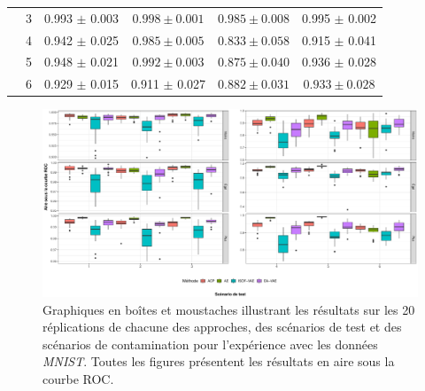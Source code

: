 \begin{table}[h]
\begin{tabular}{|c|c|c c c c|}
		& 3 & 0.993 $\pm$ 0.003 & $\mathbf{0.998 \pm 0.001}$ & $0.985 \pm 0.008$ & 0.995 $\pm$ 0.002   \\
		& 4 & 0.942 $\pm$ 0.025 & $\mathbf{0.985 \pm 0.005}$ & $0.833 \pm 0.058$ & 0.915 $\pm$ 0.041   \\			
		& 5 & 0.948 $\pm$ 0.021 & $\mathbf{0.992 \pm 0.003}$ & $0.875 \pm 0.040$ & 0.936 $\pm$ 0.028   \\
		& 6 & 0.929 $\pm$ 0.015 & 0.911 $\pm$ 0.027 & $0.882 \pm 0.031$ & $0.933 \pm 0.028$   \\
		\midrule
	\end{tabular} 
	\label{tab:auc_mnist}
\end{table}

\begin{figure}[H]
	\centering
	\includegraphics[width=\linewidth]{images/images_boxplots/auc_mnist.pdf}
	\caption[Graphiques en boîtes et moustaches illustrant les résultats en aire sous la courbe ROC sur les données \textit{MNIST}.]{Graphiques en boîtes et moustaches illustrant les résultats sur les 20 réplications de chacune des approches, des scénarios de test et des scénarios de contamination pour l'expérience avec les données \textit{MNIST}. Toutes les figures présentent les résultats en aire sous la courbe ROC.}
	\label{fig:auc_mnist}
\end{figure}

